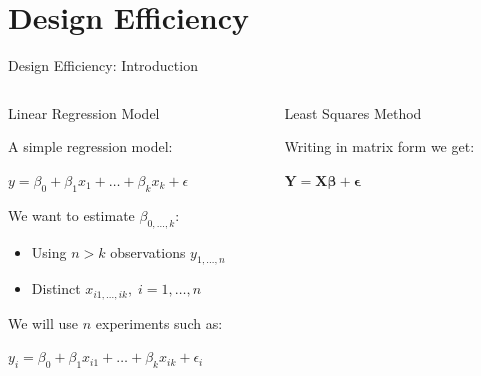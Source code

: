 \documentclass[10pt, compress, aspectratio=169, xcolor={table,usenames,dvipsnames}]{beamer}
\begin{document}
\maketitle
\section{Design Efficiency}
\label{sec:org502f41e}
\begin{frame}[label={sec:orgf8f4389}]{Design Efficiency: Introduction}
\begin{columns}
\begin{column}{0.5\columnwidth}
\begin{block}{Linear Regression Model}
\vspace{.2cm}

A simple \alert{regression model}:

\begin{center}
\(y = \beta_{0} + \beta_{1}x_{1} + \dots + \beta_{k}x_{k} + \epsilon\)
\end{center}

We want to \alert{estimate} \(\beta_{0,\dots,k}\):

\begin{itemize}
\item Using \(n > k\) \alert{observations} \(y_{1,\dots,n}\)
\item \alert{Distinct} \(x_{i1,\dots,ik}, \; i = 1,\dots,n\)
\end{itemize}

We will use \(n\) \alert{experiments} such as:

\begin{center}
\(y_{i} = \beta_{0} + \beta_{1}x_{i1} + \dots + \beta_{k}x_{ik} + \epsilon_{i}\)
\end{center}
\end{block}
\end{column}
\begin{column}{0.5\columnwidth}
\begin{block}{Least Squares Method}
\vspace{.2cm}

Writing in \alert{matrix form} we get:

\begin{center}
\(\mathbf{Y} = \mathbf{X}\bm{\beta} + \bm{\epsilon}\)
\end{center}


\end{block}
\end{column}
\end{columns}
\end{frame}
\end{document}
